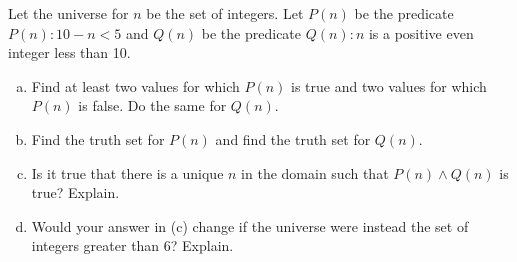 \documentclass[11pt,letterpaper]{article}
\begin{document}

 Let the universe for $n$ be the set of integers. Let $P(n)$ be the predicate $P(n) \colon 10 - n < 5$ and $Q(n)$ be the predicate $Q(n) \colon n$ is a positive even integer less than 10.
	\begin{enumerate}[(a)]
	\item Find at least two values for which $P(n)$ is true and two values for which $P(n)$ is false. Do the same for $Q(n)$. 
	\item Find the truth set for $P(n)$ and find the truth set for $Q(n)$.
	\item Is it true that there is a unique $n$ in the domain such that $P(n) \wedge Q(n)$ is true? Explain.
	\item Would your answer in (c) change if the universe were instead the set of integers greater than 6? Explain. 
	\end{enumerate} \pspace
\end{document}
